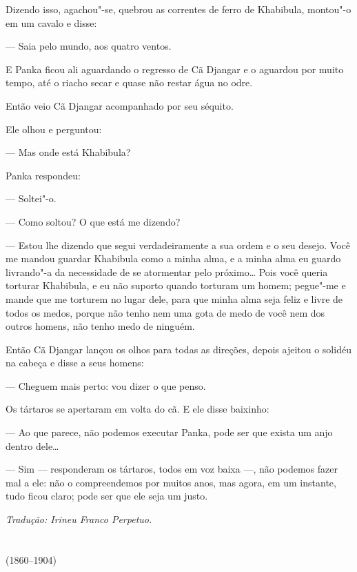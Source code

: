 Dizendo isso, agachou"-se, quebrou as correntes de ferro de Khabibula,
montou"-o em um cavalo e disse:

--- Saia pelo mundo, aos quatro ventos.

E Panka ficou ali aguardando o regresso de Cã Djangar e o aguardou por
muito tempo, até o riacho secar e quase não restar água no odre.

Então veio Cã Djangar acompanhado por seu séquito.

Ele olhou e perguntou:

--- Mas onde está Khabibula?

Panka respondeu:

--- Soltei"-o.

--- Como soltou? O que está me dizendo?

--- Estou lhe dizendo que segui verdadeiramente a sua ordem e o seu
desejo. Você me mandou guardar Khabibula como a minha alma, e a minha
alma eu guardo livrando"-a da necessidade de se atormentar pelo
próximo\ldots{} Pois você queria torturar Khabibula, e eu não suporto quando
torturam um homem; pegue"-me e mande que me torturem no lugar dele, para
que minha alma seja feliz e livre de todos os medos, porque não tenho
nem uma gota de medo de você nem dos outros homens, não tenho medo de
ninguém.

Então Cã Djangar lançou os olhos para todas as direções, depois ajeitou
o solidéu na cabeça e disse a seus homens:

--- Cheguem mais perto: vou dizer o que penso.

Os tártaros se apertaram em volta do cã. E ele disse baixinho:

--- Ao que parece, não podemos executar Panka, pode ser que exista um
anjo dentro dele\ldots{}

--- Sim --- responderam os tártaros, todos em voz baixa ---, não podemos
fazer mal a ele: não o compreendemos por muitos anos, mas agora, em um
instante, tudo ficou claro; pode ser que ele seja um justo.

\medskip

{\footnotesize\hfill\emph{Tradução: Irineu Franco Perpetuo.}}




\chapter*{}
\label{part6}
\thispagestyle{empty}

\begin{vplace}[1.5]
{\HUGES\hfill{}}

{\LARGE\hfill\textlt(1860–1904)}
\end{vplace}

